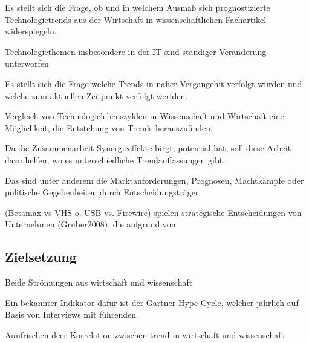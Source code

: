 Es stellt sich die Frage, ob und in welchem Ausmaß sich prognostizierte Technologietrends aus der Wirtschaft in wissenschaftlichen Fachartikel widerspiegeln.


Technologiethemen insbesondere in der IT sind ständiger Veränderung unterworfen

Es stellt sich die Frage welche Trends in naher Vergangehit verfolgt wurden und welche zum aktuellen Zeitpunkt verfolgt werfden.

Vergleich von Technologielebenszyklen in Wissenschaft und Wirtschaft eine Möglichkeit, die Entstehung von Trends herauszufinden.

Da die Zusammenarbeit Synergieeffekte birgt, potential hat, soll diese Arbeit dazu helfen, wo es unterschiedliche Trendauffassungen gibt.

Das sind unter anderem die Marktanforderungen, Prognosen, Machtkämpfe oder politische Gegebenheiten durch Entscheidungsträger

(Betamax vs VHS o. USB vs. Firewire) spielen strategische Entscheidungen von Unternehmen (Gruber2008), die aufgrund von 

\subsection{Zielsetzung}
Beide Strömungen aus wirtschaft und wissenschaft

Ein bekannter Indikator dafür ist der Gartner Hype Cycle, welcher jährlich auf Basis von Interviews mit führenden 

Auufrischen deer Korrelation zwischen trend in wirtschaft und wissenschaft